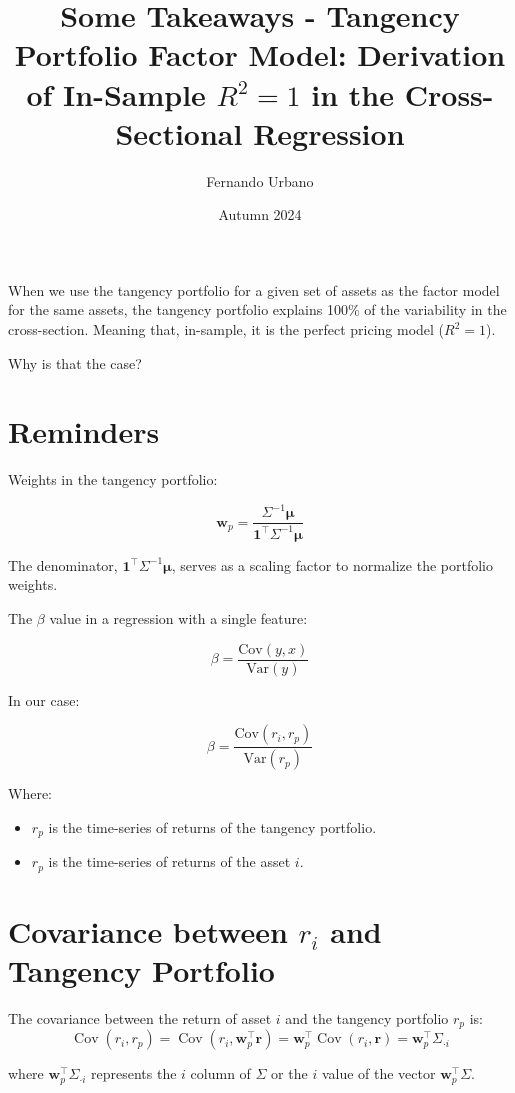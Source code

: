 \documentclass{article}
\title{Some Takeaways - Tangency Portfolio Factor Model: Derivation of In-Sample \( R^2 = 1 \) in the Cross-Sectional Regression}
\author{Fernando Urbano}
\date{Autumn 2024}
\begin{document}
\maketitle

When we use the tangency portfolio for a given set of assets as the factor model for the same assets, the tangency portfolio explains 100\% of the variability in the cross-section. Meaning that, in-sample, it is the perfect pricing model ($R^2 = 1$).

Why is that the case?

\section{Reminders}

Weights in the tangency portfolio:

\[
\mathbf{w}_p = \frac{\Sigma^{-1} \boldsymbol{\mu}}{\mathbf{1}^\top \Sigma^{-1} \boldsymbol{\mu}}
\]

The denominator, \( \mathbf{1}^\top \Sigma^{-1} \boldsymbol{\mu} \), serves as a scaling factor to normalize the portfolio weights.

The $\beta$ value in a regression with a single feature:

$$
\beta = \dfrac{\text{Cov}(y, x)}{\text{Var}(y)}
$$

In our case:

$$
\beta = \dfrac{\text{Cov}(r_i, r_p)}{\text{Var}(r_p)}
$$

Where:

\begin{itemize}
    \item $r_p$ is the time-series of returns of the tangency portfolio.
    \item $r_p$ is the time-series of returns of the asset $i$.
\end{itemize}

\section{Covariance between $r_i$ and Tangency Portfolio}

The covariance between the return of asset \( i \) and the tangency portfolio \( r_p \) is:
\[
\operatorname{Cov}(r_i, r_p) = \operatorname{Cov}\left(r_i, \mathbf{w}_p^\top \mathbf{r}\right) = \mathbf{w}_p^\top \operatorname{Cov}(r_i, \mathbf{r}) = \mathbf{w}_p^\top \Sigma_{\cdot i}
\]

where $\mathbf{w}_p^\top \Sigma_{\cdot i}$ represents the $i$ column of $\Sigma$ or the $i$ value of the vector $\mathbf{w}_p^\top \Sigma$.
\end{document}
